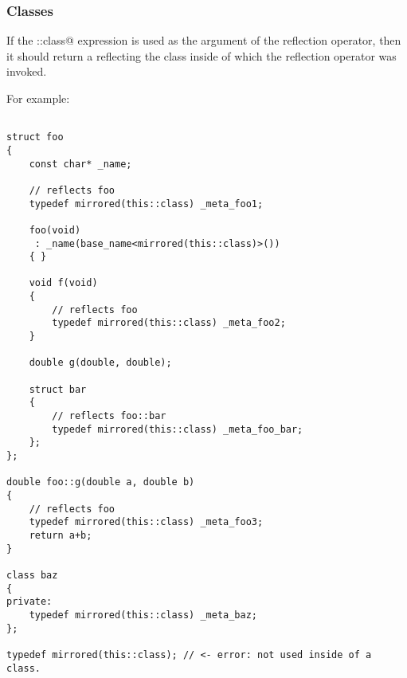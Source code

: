 \subsubsection{Classes}

If the \verb@this::class@ expression is used as the argument of the reflection
operator, then it should return a  reflecting the class
inside of which the reflection operator was invoked.

For example:

\begin{verbatim}

struct foo
{
	const char* _name;

	// reflects foo
	typedef mirrored(this::class) _meta_foo1;

	foo(void)
	 : _name(base_name<mirrored(this::class)>())
	{ }

	void f(void)
	{
		// reflects foo
		typedef mirrored(this::class) _meta_foo2;
	}

	double g(double, double);

	struct bar
	{
		// reflects foo::bar
		typedef mirrored(this::class) _meta_foo_bar;
	};
};

double foo::g(double a, double b)
{
	// reflects foo
	typedef mirrored(this::class) _meta_foo3;
	return a+b;
}

class baz
{
private:
	typedef mirrored(this::class) _meta_baz;
};

typedef mirrored(this::class); // <- error: not used inside of a class.

\end{verbatim}

